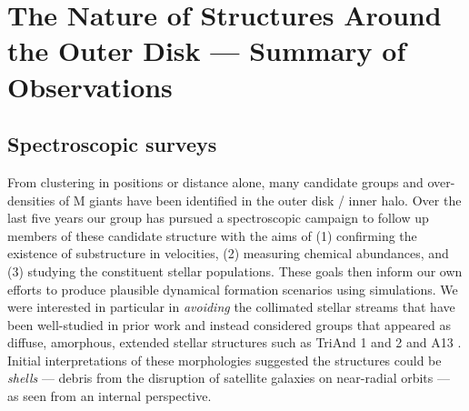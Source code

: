 \documentclass[galaxies,article,submit,moreauthors,pdftex,10pt,a4paper]{mdpi}
\begin{document}

\section{The Nature of Structures Around the Outer Disk --- Summary of Observations}
\label{sec:obs}

\subsection{Spectroscopic surveys}

From clustering in positions or distance alone, many candidate groups and
over-densities of M giants have been identified in the outer disk / inner halo.
Over the last five years our group has pursued a spectroscopic campaign to
follow up members of these candidate structure with the aims of (1) confirming
the existence of substructure in velocities, (2) measuring chemical abundances,
and (3) studying the constituent stellar populations.
These goals then inform our own efforts to produce plausible dynamical
formation scenarios using simulations.
We were interested in particular in {\it avoiding} the collimated stellar streams that have been well-studied in prior work \cite[such as Sgr, Orphan, GD1 and Pal 5 --- see, e.g.,][]{law10,koposov10,kuepper15,bovy16}
and instead considered groups that appeared as diffuse, amorphous, extended stellar structures such as TriAnd 1 and 2 \cite{rochapinto04} and A13 \cite{sharma10}.
Initial interpretations of these morphologies suggested the structures could be {\it shells} --- debris from the disruption of satellite galaxies on near-radial orbits \cite{johnston08} --- as seen from an internal perspective.
\end{document}
